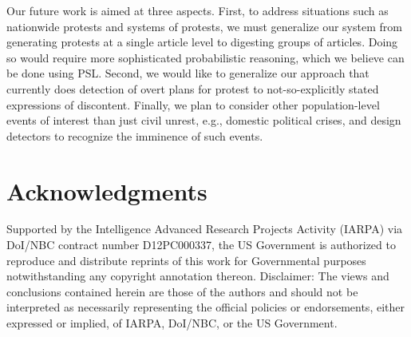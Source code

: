 \documentclass[letterpaper]{article}
\begin{document}
Our future work is aimed at three aspects. First, to address situations
such as nationwide protests and systems of protests, we must generalize
our system from generating protests at a single article level to
digesting groups of articles. Doing so would require more sophisticated
probabilistic reasoning, which we believe can be done using PSL.
Second, we would like to generalize our
approach that currently does detection of overt plans for protest to
not-so-explicitly stated expressions of discontent.  Finally, we plan to
consider other population-level events of interest than just civil
unrest, e.g., domestic political crises, and design detectors to
recognize the imminence of such events.

\section*{Acknowledgments}
Supported by the Intelligence Advanced Research Projects Activity (IARPA) via
DoI/NBC contract number D12PC000337, the US Government is authorized to
reproduce and distribute reprints of this work for Governmental purposes
notwithstanding any copyright annotation thereon.  Disclaimer: The views and
conclusions contained herein are those of the authors and should not be
interpreted as necessarily representing the official policies or endorsements,
either expressed or implied, of IARPA, DoI/NBC, or the US Government.


\end{document}
